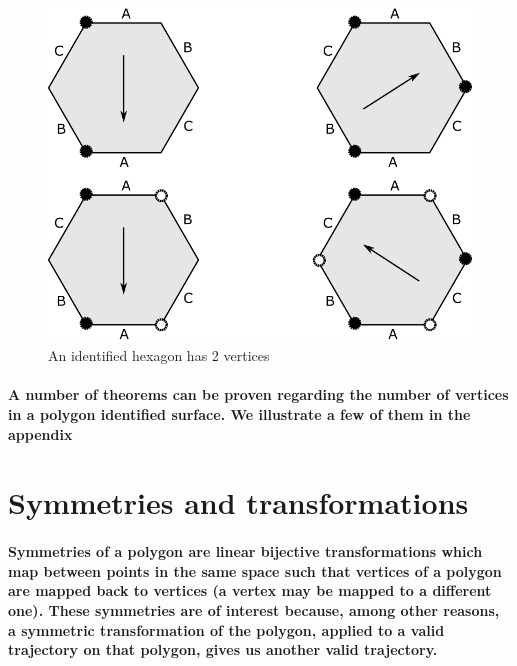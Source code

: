 \documentclass{report}
\begin{document}
\begin{figure} 
\begin{center}
\includegraphics[scale=0.3]{5}
\caption{An identified hexagon has 2 vertices}
\end{center}
\end{figure}

\paragraph{A number of theorems can be proven regarding the number of vertices in a polygon identified surface. We illustrate a few of them in the appendix}


\section{Symmetries and transformations}

\paragraph{Symmetries of a polygon are linear bijective transformations which map between points in the same space such that vertices of a polygon are mapped back to vertices (a vertex may be mapped to a different one). 
These symmetries are of interest because, among other reasons, a symmetric transformation of the polygon, applied to a valid trajectory on that polygon, gives us another valid trajectory.}
\end{document}

